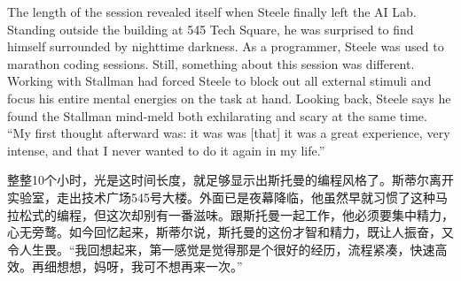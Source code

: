 \ifdefined\eng
The length of the session revealed itself when Steele finally left the AI Lab. Standing outside the building at 545 Tech Square, he was surprised to find himself surrounded by nighttime darkness. As a programmer, Steele was used to marathon coding sessions. Still, something about this session was different. Working with Stallman had forced Steele to block out all external stimuli and focus his entire mental energies on the task at hand. Looking back, Steele says he found the Stallman mind-meld both exhilarating and scary at the same time. ``My first thought afterward \ifdefined\vone was: it was \fi\ifdefined\vtwo was [that] it was \fi a great experience, very intense, and that I never wanted to do it again in my life.''
\fi

\ifdefined\chs
整整10个小时，光是这时间长度，就足够显示出斯托曼的编程风格了。斯蒂尔离开实验室，走出技术广场545号大楼。外面已是夜幕降临，他虽然早就习惯了这种马拉松式的编程，但这次却别有一番滋味。跟斯托曼一起工作，他必须要集中精力，心无旁鹜。如今回忆起来，斯蒂尔说，斯托曼的这份才智和精力，既让人振奋，又令人生畏。``我回想起来，第一感觉是觉得那是个很好的经历，流程紧凑，快速高效。再细想想，妈呀，我可不想再来一次。''
\fi

\theendnotes
\setcounter{endnote}{0}
